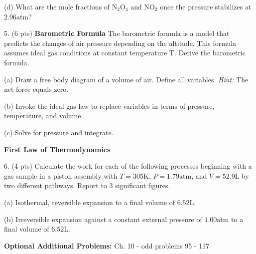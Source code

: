 \documentclass[11pt]{article}
\begin{document}
(d) What are the mole fractions of N$_2$O$_4$ and NO$_2$ once the pressure stabilizes at
2.96atm?

\vspace{2.5in}

5. (6 pts) \textbf{Barometric Formula} The barometric formula is a model that predicts the
changes of air pressure depending on the altitude. This formula assumes ideal
gas conditions at constant temperature T. Derive the barometric formula.

(a) Draw a free body diagram of a volume of air. Define all variables. \textit{Hint:}
The net force equals zero.

(b) Invoke the ideal gas law to replace variables in terms of pressure, temperature, and
volume.

(c) Solve for pressure and integrate.

%

\vspace{3in}

\textbf{First Law of Thermodynamics}

6. (4 pts) Calculate the work for each of the following processes beginning with a gas
sample in a piston assembly with $T=305\text{K}$, $P=1.79\text{atm}$, and
$V=52.9\text{L}$ by two different pathways. Report to 3 significant figures.

(a) Isothermal, reversible expansion to a final volume of $6.52\text{L}$.

(b) Irreversible expansion against a constant external pressure of $1.00\text{atm}$
to a final volume of $6.52\text{L}$.

\vfill
\textbf{Optional Additional Problems:} Ch. 10 - odd problems 95 - 117
\end{document}

